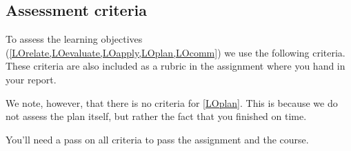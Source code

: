%
%

\subsection{Assessment criteria}

To assess the learning objectives
(\cref{LOrelate,LOevaluate,LOapply,LOplan,LOcomm})
we use the following criteria.
These criteria are also included as a rubric in the assignment where you hand 
in your report.

We note, however, that there is no criteria for \cref{LOplan}.
This is because we do not assess the plan itself, but rather the fact that you 
finished on time.

You'll need a pass on all criteria to pass the assignment and the course.

